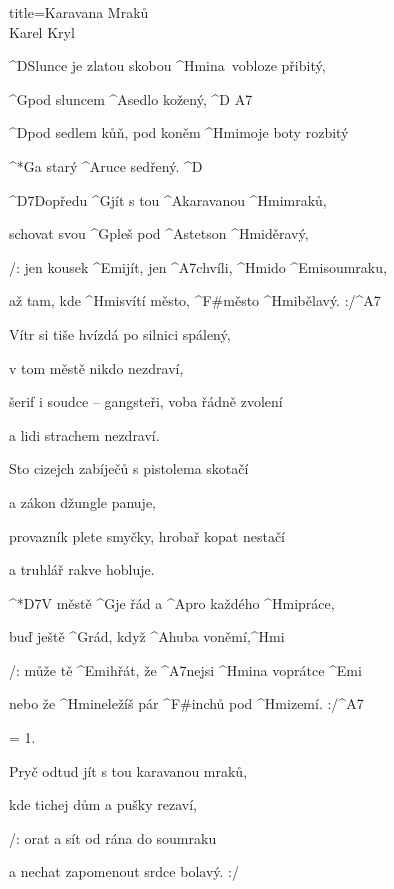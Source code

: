 \begin{song}{title=\predtitle\centering Karavana Mraků \\\large Karel Kryl  \vspace*{-0.3cm}}  %
\begin{centerjustified}

\sloka
	^{D}Slunce je zlatou skobou ^{Hmi\z}na~vobloze přibitý, 

	^{G}pod sluncem ^{A}sedlo kožený, ^{D A7} 
	
	^{D}pod sedlem kůň, pod koněm ^{Hmi}moje boty rozbitý 

	^*{G\z}a starý ^{A}ruce sedřený. ^{D} 

	^{D7}Dopředu ^{G}jít s tou ^{A}karavanou ^{Hmi}mraků, 

	schovat svou ^{G}pleš pod ^{A}stetson ^{Hmi}děravý,

	/: jen kousek ^{Emi}jít, jen ^{A7}chvíli, ^{Hmi}do ^{Emi}soumraku, 

	až tam, kde ^{Hmi}svítí město, ^{F#}město ^{Hmi}bělavý. :/^{A7}

\sloka
	Vítr si tiše hvízdá po silnici spálený, 

	v tom městě nikdo nezdraví,  

	šerif i soudce -- gangsteři, voba řádně zvolení

	a lidi strachem nezdraví. 

\sloka
	Sto cizejch zabíječů s pistolema skotačí 

	a zákon džungle panuje, 

	provazník plete smyčky, hrobař kopat nestačí 

	a truhlář rakve hobluje. 

	^*{D7\z}V městě ^{G}je řád a ^{A}pro každého ^{Hmi}práce, 

	 buď ještě ^{G}rád, když ^{A}huba voněmí,^{Hmi}  
 
	/: může tě ^{Emi}hřát, že ^{A7}nejsi ^{Hmi}na voprátce ^{Emi}  

	nebo že ^{Hmi}neležíš pár ^{F#}inchů pod ^{Hmi}zemí. :/^{A7}  

\sloka = 1.

	Pryč odtud jít s tou karavanou mraků, 

	kde tichej dům a pušky rezaví,  

	/: orat a sít od rána do soumraku  

	a nechat zapomenout srdce bolavý. :/  

\end{centerjustified}
\setcounter{Slokočet}{0}
\end{song}
